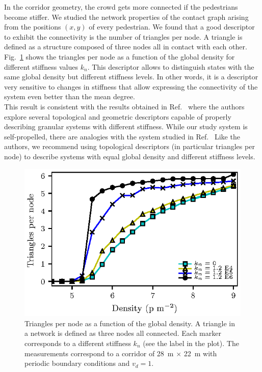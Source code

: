 \documentclass[preprint,12pt]{elsarticle}
\begin{document}
In the corridor geometry, the crowd gets more connected if the pedestrians become stiffer. We studied the network properties of the contact graph arising from the positions $(x,y)$ of every pedestrian. We found that a good descriptor to exhibit the connectivity is the number of triangles per node. A triangle is defined as a structure composed of three nodes all in contact with each other. Fig.~\ref{triangles} shows the triangles per node as a function of the global density for different stiffness values $k_n$. This descriptor allows to distinguish states with the same global density but different stiffness levels. In other words, it is a descriptor very sensitive to changes in stiffness that allow expressing the connectivity of the system even better than the mean degree. \\

This result is consistent with the results obtained in Ref.~\cite{pugnaloni_2013} where the authors explore several topological and geometric descriptors capable of properly describing granular systems with different stiffness. While our study system is self-propelled, there are analogies with the system studied in Ref.~\cite{pugnaloni_2013} Like the authors, we recommend using topological descriptors (in particular triangles per node) to describe systems with equal global density and different stiffness levels.\\

\begin{figure}[htbp!]
\centering
\includegraphics[width=0.7\columnwidth]
{./triangles.eps}
\caption{\label{triangles} Triangles per node as a function of the global density. A triangle in a network is defined as three nodes all connected. Each marker corresponds to a different stiffness $k_n$ (see the label in the plot). The measurements correspond to a corridor of 28~m $\times$ 22~m with periodic boundary conditions and $v_d=1$.  }
\end{figure}
\end{document}
